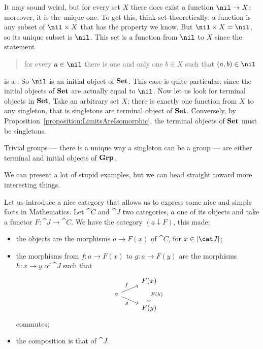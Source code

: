 \begin{example}
It may sound weird, but for every set \(X\) there does exist a function \(\nil \to X\); moreover, it is the unique one. To get this, think set-theoretically: a function is any subset of \(\nil \times X\) that has the property we know. But \(\nil \times X = \nil\), so its unique subset is \(\nil\). This set is a function from \(\nil\) to \(X\) since the statement
\begin{quotation}
for every \(a \in \nil\) there is one and only one \(b \in X\) such that \((a, b) \in \nil\)
\end{quotation}
is a .
So \(\nil\) is an initial object of \(\mathbf{Set}\). This case is quite particular, since the initial objects of \(\mathbf{Set}\) are actually equal to \(\nil\). \newline
Now let us look for terminal objects in \(\mathbf{Set}\). Take an arbitrary set \(X\): there is exactly one function from \(X\) to any singleton, that is singletons are terminal object of \(\mathbf{Set}\). Conversely, by Proposition~\ref{proposition:LimitsAreIsomorphic}, the terminal objects of \(\mathbf{Set}\) must be singletons.
\end{example}

\begin{exercise}
Trivial groups --- there is a unique way a singleton can be a group --- are either terminal and initial objects of \(\mathbf{Grp}\).
\end{exercise}

We can present a lot of stupid examples, but we can head straight toward more interesting things.

\begin{construction}
Let us introduce a nice category that allows us to express some nice and simple facts in Mathematics. Let \(\cat C\) and \(\cat J\) two categories, \(a\) one of its objects and take a functor \(F : \cat J \to \cat C\). We have the category \((a \downarrow F)\), this made:
\begin{itemize}
\item the objects are the morphisms \(a \to F(x)\) of \(\cat C\), for \(x \in \obj{\cat J}\);
\item the morphisms from \(f : a \to F(x)\) to \(g : a \to F(y)\) are the morphisms \(h : x \to y\) of \(\cat J\) such that
\[\begin{tikzcd}[row sep=tiny]
 & F(x) \ar["{F(h)}", dd] \\
a \ar["f", ur] \ar["g", dr, swap] \\
 & F(y)
\end{tikzcd}\]
commutes;
\item the composition is that of \(\cat J\). 
\end{itemize}
\end{construction}

